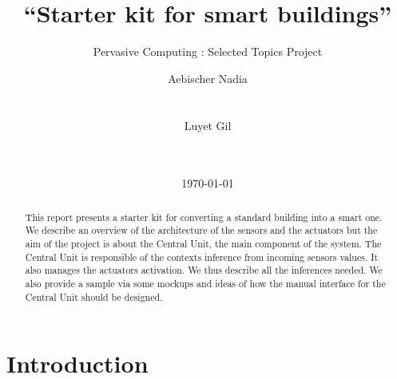 \documentclass{acm_proc_article-sp}
\begin{document}
\graphicspath{{figures/}}
\lstset{language=XML}     
\title{“Starter kit for smart buildings”}
\subtitle{Pervasive Computing : Selected Topics Project}

%
\author{
\alignauthor 
  Aebischer Nadia
  \\
  \\
  \\
\alignauthor 
  Luyet Gil
  \\
  \\
  \\
}
\date{\today}
\maketitle
\begin{abstract}
This report presents a starter kit for converting a standard building into a smart one.
We describe an overview of the architecture of the sensors and the actuators but the aim of the project is about the Central Unit, the main component of the system.
The Central Unit is responsible of the contexts inference from incoming sensors values.
It also manages the actuators activation.
We thus describe all the inferences needed.
We also provide a sample via some mockups and ideas of how the manual interface for the Central Unit should be designed.
\end{abstract}
\section{Introduction}
\end{document}
